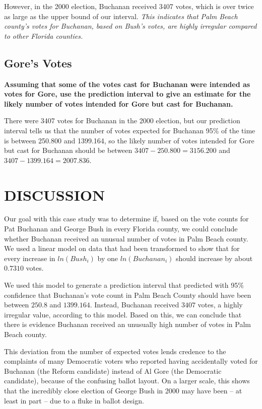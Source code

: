 \documentclass[
  letterpaper,
  DIV=11,
  numbers=noendperiod]{scrartcl}
\begin{document}
However, in the 2000 election, Buchanan received 3407 votes, which is
over twice as large as the upper bound of our interval. \emph{This
indicates that Palm Beach county's votes for Buchanan, based on Bush's
votes, are highly irregular compared to other Florida counties.}

\hypertarget{gores-votes}{%
\subsection{Gore's Votes}\label{gores-votes}}

\textbf{Assuming that some of the votes cast for Buchanan were intended
as votes for Gore, use the prediction interval to give an estimate for
the likely number of votes intended for Gore but cast for Buchanan.}

There were 3407 votes for Buchanan in the 2000 election, but our
prediction interval tells us that the number of votes expected for
Buchanan 95\% of the time is between 250.800 and 1399.164, so the likely
number of votes intended for Gore but cast for Buchanan should be
between \(3407-250.800 = 3156.200\) and \(3407-1399.164 = 2007.836\).

\hypertarget{discussion}{%
\section{DISCUSSION}\label{discussion}}

Our goal with this case study was to determine if, based on the vote
counts for Pat Buchanan and George Bush in every Florida county, we
could conclude whether Buchanan received an unusual number of votes in
Palm Beach county. We used a linear model on data that had been
transformed to show that for every increase in \(ln(Bush_i)\) by one
\(ln(Buchanan_i)\) should increase by about \(0.7310\) votes.

We used this model to generate a prediction interval that predicted with
95\% confidence that Buchanan's vote count in Palm Beach County should
have been between \(250.8\) and \(1399.164\). Instead, Buchanan received
\(3407\) votes, a highly irregular value, according to this model. Based
on this, we can conclude that there is evidence Buchanan received an
unusually high number of votes in Palm Beach county.

This deviation from the number of expected votes lends credence to the
complaints of many Democratic voters who reported having accidentally
voted for Buchanan (the Reform candidate) instead of Al Gore (the
Democratic candidate), because of the confusing ballot layout. On a
larger scale, this shows that the incredibly close election of George
Bush in 2000 may have been -- at least in part -- due to a fluke in
ballot design.
\end{document}

